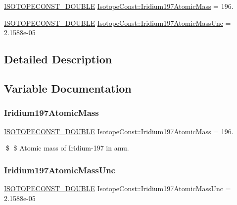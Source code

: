 \begin{DoxyCompactItemize}
\item 
\mbox{\hyperlink{group___isotope_const-_macros_ga8f45a7272ce02c0b4c65c44636ed719a}{I\+S\+O\+T\+O\+P\+E\+C\+O\+N\+S\+T\+\_\+\+D\+O\+U\+B\+LE}} \mbox{\hyperlink{group___isotope_const-_iridium-_ir197_ga35509fc30fcdcff27ec90ae30c98950c}{Isotope\+Const\+::\+Iridium197\+Atomic\+Mass}} = 196.
\item 
\mbox{\hyperlink{group___isotope_const-_macros_ga8f45a7272ce02c0b4c65c44636ed719a}{I\+S\+O\+T\+O\+P\+E\+C\+O\+N\+S\+T\+\_\+\+D\+O\+U\+B\+LE}} \mbox{\hyperlink{group___isotope_const-_iridium-_ir197_gaffb7b75983c964d135e17e35656f4ace}{Isotope\+Const\+::\+Iridium197\+Atomic\+Mass\+Unc}} = 2.\+1588e-\/05
\end{DoxyCompactItemize}


\subsection{Detailed Description}


\subsection{Variable Documentation}
\mbox{\label{group___isotope_const-_iridium-_ir197_ga35509fc30fcdcff27ec90ae30c98950c}} 
\subsubsection{\texorpdfstring{Iridium197\+Atomic\+Mass}{Iridium197AtomicMass}}
{\footnotesize\ttfamily \mbox{\hyperlink{group___isotope_const-_macros_ga8f45a7272ce02c0b4c65c44636ed719a}{I\+S\+O\+T\+O\+P\+E\+C\+O\+N\+S\+T\+\_\+\+D\+O\+U\+B\+LE}} Isotope\+Const\+::\+Iridium197\+Atomic\+Mass = 196.}

\$ \$ Atomic mass of Iridium-\/197 in amu. \mbox{\label{group___isotope_const-_iridium-_ir197_gaffb7b75983c964d135e17e35656f4ace}} 
\subsubsection{\texorpdfstring{Iridium197\+Atomic\+Mass\+Unc}{Iridium197AtomicMassUnc}}
{\footnotesize\ttfamily \mbox{\hyperlink{group___isotope_const-_macros_ga8f45a7272ce02c0b4c65c44636ed719a}{I\+S\+O\+T\+O\+P\+E\+C\+O\+N\+S\+T\+\_\+\+D\+O\+U\+B\+LE}} Isotope\+Const\+::\+Iridium197\+Atomic\+Mass\+Unc = 2.\+1588e-\/05}

